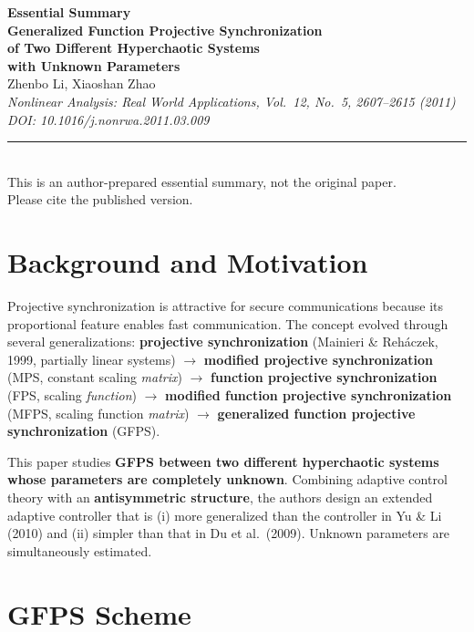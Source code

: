 \documentclass[11pt,a4paper]{article}
\begin{document}
\raggedbottom

\begin{center}
{\LARGE\bfseries\color{primary}Essential Summary}\\[12pt]
{\large\bfseries Generalized Function Projective Synchronization\\of Two Different Hyperchaotic Systems\\with Unknown Parameters}\\[8pt]
{\normalsize Zhenbo Li, Xiaoshan Zhao}\\[4pt]
{\small\itshape Nonlinear Analysis: Real World Applications, Vol.\ 12, No.\ 5, 2607--2615 (2011)\\DOI: 10.1016/j.nonrwa.2011.03.009}\\[6pt]
{\small\rule{0.7\textwidth}{0.5pt}}\\[4pt]
{\small\color{accent}This is an author-prepared essential summary, not the original paper.\\Please cite the published version.}
\end{center}

\vspace{0.5em}

\section{Background and Motivation}

Projective synchronization is attractive for secure communications because its proportional feature enables fast communication. The concept evolved through several generalizations: \textbf{projective synchronization} (Mainieri \& Reh\'aczek, 1999, partially linear systems) $\to$ \textbf{modified projective synchronization} (MPS, constant scaling \emph{matrix}) $\to$ \textbf{function projective synchronization} (FPS, scaling \emph{function}) $\to$ \textbf{modified function projective synchronization} (MFPS, scaling function \emph{matrix}) $\to$ \textbf{generalized function projective synchronization} (GFPS).

This paper studies \textbf{GFPS between two different hyperchaotic systems whose parameters are completely unknown}. Combining adaptive control theory with an \textbf{antisymmetric structure}, the authors design an extended adaptive controller that is (i) more generalized than the controller in Yu \& Li (2010) and (ii) simpler than that in Du et al.\ (2009). Unknown parameters are simultaneously estimated.

\section{GFPS Scheme}
\end{document}

